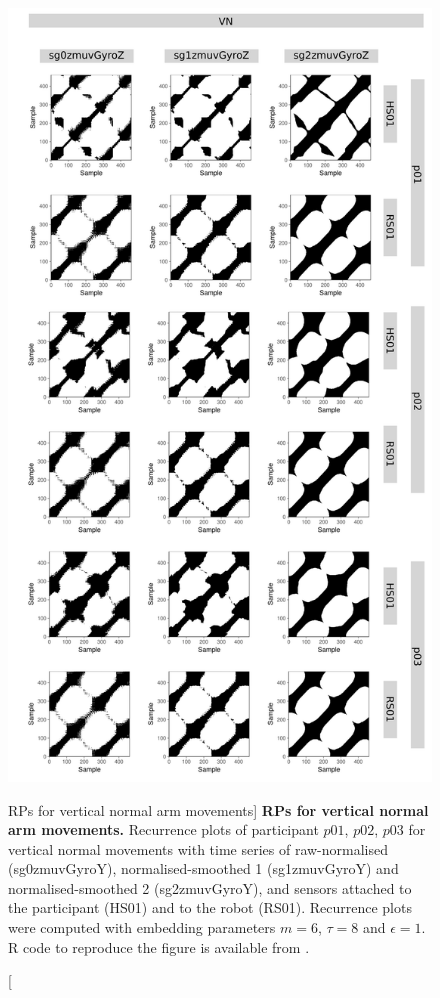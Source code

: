 \begin{figure}
\centering
\includegraphics[height=0.80\textheight]{rp_VN}
\caption
	[RPs for vertical normal arm movements]{
	{\bf RPs for vertical normal arm movements.}	
	Recurrence plots %
	of participant $p01$, $p02$, $p03$ for vertical normal 
	movements with time series of raw-normalised (sg0zmuvGyroY), 
	normalised-smoothed 1 (sg1zmuvGyroY) and 
	normalised-smoothed 2 (sg2zmuvGyroY), and 
	sensors attached to the participant (HS01) and to the robot (RS01).
	Recurrence plots were computed with 
	embedding parameters $m=6$, $\tau=8$ and $\epsilon=1$.
	R code to reproduce the figure is available from \cite{xochicale2018}.
        }
    \label{fig:rp_VN}
\end{figure}



